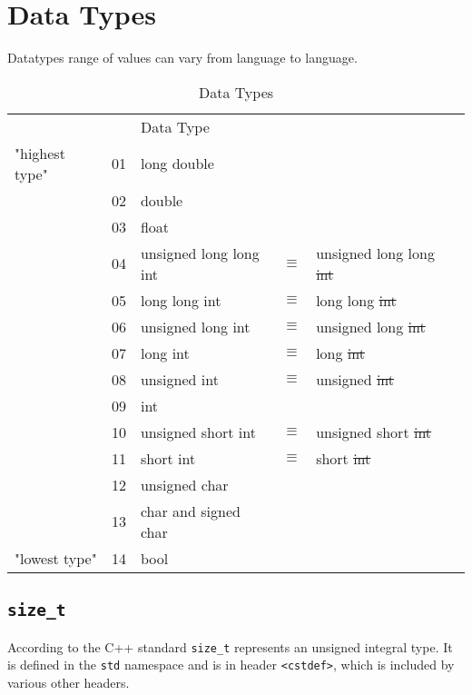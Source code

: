 \section{Data Types}
\label{sec:Data-Types}
Datatypes range of values can vary from language to language. 
\begin{table}[!h]
\centering
\begin{tabular}{llllll}
               &    & Data Type            &          &                    &   \\
"highest type" & 01 & long double          &          &                    &   \\
               & 02 & double               &          &                    &   \\
               & 03 & float                &          &                    &   \\
               & 04 & unsigned long long int   & $\equiv$ & unsigned long long \st{int}&   \\
               & 05 & long long int        & $\equiv$ & long long \st{int} &   \\
               & 06 & unsigned long int    & $\equiv$ & unsigned long \st{int} &   \\
               & 07 & long int             & $\equiv$ & long \st{int}      &   \\
               & 08 & unsigned int         & $\equiv$ & unsigned \st{int}  &   \\
               & 09 & int                  &          &                    &   \\
               & 10 & unsigned short int   & $\equiv$ & unsigned short \st{int} &   \\
               & 11 & short int            & $\equiv$ & short \st{int}     &   \\
               & 12 & unsigned char        &          &                    &   \\
               & 13 & char and signed char &          &                    &   \\
"lowest type"  & 14 & bool                 &          &                    &  
\end{tabular}
\caption{Data Types}
\label{tab:t_00_Data-types_Cpp}
\end{table}

\subsection{\texttt{size\_t}}
According to the C++ standard \texttt{size\_t} represents an unsigned integral type. It is defined in the \texttt{std} namespace and is in header \texttt{<cstdef>}, which is included by various other headers.

